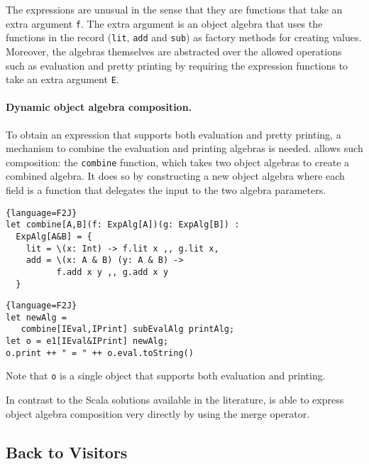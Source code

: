 \noindent The expressions are unusual in the sense that they are
functions that take an extra argument \lstinline$f$. The extra
argument is an object algebra that uses the functions in the record
(\lstinline$lit$, \lstinline$add$ and \lstinline$sub$) as factory
methods for creating values. Moreover, the algebras themselves are
abstracted over the allowed operations such as evaluation and pretty
printing by requiring the expression functions to take an extra
argument \lstinline$E$.

\paragraph{Dynamic object algebra composition.}
To obtain an expression that supports both evaluation and pretty
printing, a mechanism to combine the evaluation and printing
algebras is needed. \name allows such composition: the \lstinline$combine$
function, which takes two object algebras to create a combined algebra. It
does so by constructing a new object algebra where each field is a
function that delegates the input to the two algebra parameters.
\begin{lstlisting}{language=F2J}
let combine[A,B](f: ExpAlg[A])(g: ExpAlg[B]) : 
  ExpAlg[A&B] = {
    lit = \(x: Int) -> f.lit x ,, g.lit x,
    add = \(x: A & B) (y: A & B) ->
          f.add x y ,, g.add x y
  }
\end{lstlisting}

\begin{lstlisting}{language=F2J}
let newAlg = 
   combine[IEval,IPrint] subEvalAlg printAlg;
let o = e1[IEval&IPrint] newAlg;
o.print ++ " = " ++ o.eval.toString()
\end{lstlisting}

Note that \lstinline$o$ is a single object that supports both
evaluation and printing. 

In contrast to the Scala solutions available in the
literature, \name is able to express object algebra
composition very directly by using the merge operator. 

\subsection{Back to Visitors}

